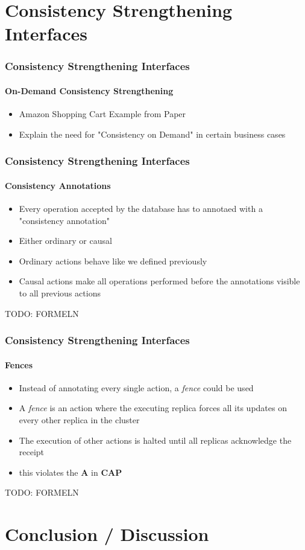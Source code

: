 \documentclass[11pt]{beamer}
\begin{document}
\section{Consistency Strengthening Interfaces}

\begin{frame}
\frametitle{Consistency Strengthening Interfaces}
\framesubtitle{On-Demand Consistency Strengthening}
\begin{itemize}
\item Amazon Shopping Cart Example from Paper
\item Explain the need for "Consistency on Demand" in certain business cases
\end{itemize}
\end{frame}

\begin{frame}
\frametitle{Consistency Strengthening Interfaces}
\framesubtitle{Consistency Annotations}
\begin{itemize}
\item Every operation accepted by the database has to annotaed with a "consistency annotation"
\item Either ordinary or causal
\item Ordinary actions behave like we defined previously
\item Causal actions make all operations performed before the annotations visible to all previous actions
\end{itemize}
TODO: FORMELN
\end{frame}

\begin{frame}
\frametitle{Consistency Strengthening Interfaces}
\framesubtitle{Fences}
\begin{itemize}
\item Instead of annotating every single action, a \textit{fence} could be used
\item A \textit{fence} is an action where the executing replica forces all its updates on every other replica in the cluster
\item The execution of other actions is halted until all replicas acknowledge the receipt
\item this violates the \textbf{A} in \textbf{CAP}
\end{itemize}
TODO: FORMELN
\end{frame}

\section{Conclusion / Discussion}
\end{document}
